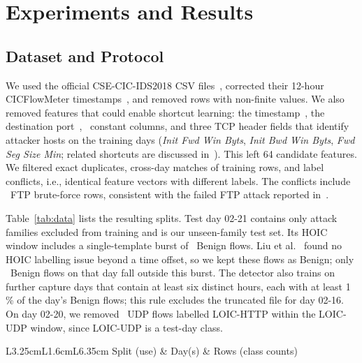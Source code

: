 \documentclass[runningheads,a4paper]{llncs}
\begin{document}
\section{Experiments and Results}\label{sec:experiments}

\subsection{Dataset and Protocol}\label{sec:protocol}

We used the official CSE-CIC-IDS2018 CSV files~\cite{cic2018page,sharafaldin2018}, corrected their 12-hour CICFlowMeter timestamps~\cite{cicflowmeter}, and removed rows with non-finite values. We also removed features that could enable shortcut learning: the timestamp~\cite{engelen2021,flood2024}, the destination port~\cite{dhooge2022}, \ConstantCount\ constant columns, and three TCP header fields that identify attacker hosts on the training days (\emph{Init Fwd Win Byts}, \emph{Init Bwd Win Byts}, \emph{Fwd Seg Size Min}; related shortcuts are discussed in~\cite{flood2024,engelen2021}). This left 64 candidate features. We filtered exact duplicates, cross-day matches of training rows, and label conflicts, i.e., identical feature vectors with different labels. The conflicts include \FtpConflictRows\ FTP brute-force rows, consistent with the failed FTP attack reported in~\cite{liu2022error}.

Table~\ref{tab:data} lists the resulting splits. Test day 02-21 contains only attack families excluded from training and is our unseen-family test set. Its HOIC window includes a single-template burst of \BurstRows\ Benign flows. Liu et al.~\cite{liu2022error} found no HOIC labelling issue beyond a time offset, so we kept these flows as Benign; only \TestBenignOutside\ Benign flows on that day fall outside this burst. The detector also trains on further capture days that contain at least six distinct hours, each with at least 1\,\% of the day's Benign flows; this rule excludes the truncated file for day 02-16. On day 02-20, we removed \MislabelledUdpRows\ UDP flows labelled LOIC-HTTP within the LOIC-UDP window, since LOIC-UDP is a test-day class.

\begin{table}[t]
\caption{Data splits after cleaning: the hold-out contains the latest 20\,\% of each day and class.}\label{tab:data}
\centering\scriptsize
\setlength{\tabcolsep}{3pt}
\begin{tabular}{L{3.25cm}L{1.6cm}L{6.35cm}}
\toprule
Split (use) & Day(s) & Rows (class counts) \\
\midrule
{}
\bottomrule
\end{tabular}
\end{table}
\end{document}
